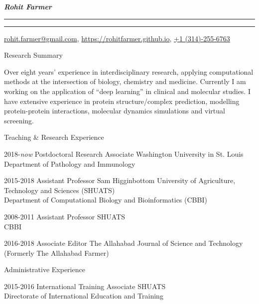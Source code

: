 \documentclass[10pt]{article}
\begin{document}
\settowidth{\cvlabelwidth}{%
\cvlabelfont 2009-2009%
}%
\begin{cv}{\huge \it \bfseries Rohit Farmer}
\vskip3pt
\hrule\hrule
\vskip3pt
\hfill \url{rohit.farmer@gmail.com},  \url{https://rohitfarmer.github.io}, \url{+1 (314)-255-6763}

{
\setlength{\cvlabelsep}{0mm}
\setlength{\cvlabelwidth}{0mm}
\begin{cvlist}{Research Summary}
	\item Over   eight   years’   experience   in   interdisciplinary   research,   applying   computational   methods   at   the intersection of biology, chemistry  and medicine. Currently I  am  working  on the application of  “deep learning”   in   clinical   and   molecular   studies.   I   have   extensive   experience   in   protein   structure/complex prediction, modelling protein-protein interactions, molecular dynamics simulations and virtual screening.
\end{cvlist}
}

\begin{cvlist}{Teaching \& Research Experience}
	\item[2018-\emph{now}] Postdoctoral Research Associate \hfill Washington University in St. Louis\\  \hspace*{\fill} Department of Pathology and Immunology
	\item[2015-2018] Assistant Professor \hfill Sam Higginbottom University of Agriculture, Technology and Sciences (SHUATS)\\  \hspace*{\fill} Department of Computational Biology and Bioinformatics (CBBI)
	\item[2008-2011] Assistant Professor \hfill SHUATS\\  \hspace*{\fill} CBBI
	\item[2016-2018] Associate Editor \hfill The Allahabad Journal of Science and Technology \\  \hspace*{\fill} (Formerly The Allahabad Farmer)
\end{cvlist}

\begin{cvlist}{Administrative Experience}
	\item[2015-2016] International Training Associate \hfill SHUATS \\  \hspace*{\fill} Directorate of International Education and Training
\end{cvlist}


\end{cv}
\end{document}
